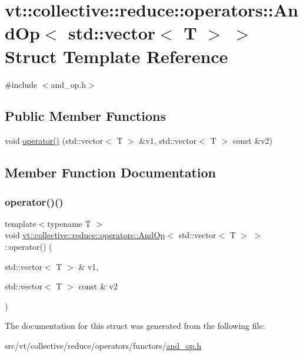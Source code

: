 \hypertarget{structvt_1_1collective_1_1reduce_1_1operators_1_1_and_op_3_01std_1_1vector_3_01_t_01_4_01_4}{}\section{vt\+:\+:collective\+:\+:reduce\+:\+:operators\+:\+:And\+Op$<$ std\+:\+:vector$<$ T $>$ $>$ Struct Template Reference}
\label{structvt_1_1collective_1_1reduce_1_1operators_1_1_and_op_3_01std_1_1vector_3_01_t_01_4_01_4}


{\ttfamily \#include $<$and\+\_\+op.\+h$>$}

\subsection*{Public Member Functions}
\begin{DoxyCompactItemize}
\item 
void \hyperlink{structvt_1_1collective_1_1reduce_1_1operators_1_1_and_op_3_01std_1_1vector_3_01_t_01_4_01_4_a70bb730a82e9ff53c5ca58e4bfa1f9e4}{operator()} (std\+::vector$<$ T $>$ \&v1, std\+::vector$<$ T $>$ const \&v2)
\end{DoxyCompactItemize}


\subsection{Member Function Documentation}
\mbox{\label{structvt_1_1collective_1_1reduce_1_1operators_1_1_and_op_3_01std_1_1vector_3_01_t_01_4_01_4_a70bb730a82e9ff53c5ca58e4bfa1f9e4}} 
\subsubsection{\texorpdfstring{operator()()}{operator()()}}
{\footnotesize\ttfamily template$<$typename T $>$ \\
void \hyperlink{structvt_1_1collective_1_1reduce_1_1operators_1_1_and_op}{vt\+::collective\+::reduce\+::operators\+::\+And\+Op}$<$ std\+::vector$<$ T $>$ $>$\+::operator() (\begin{DoxyParamCaption}\item[{std\+::vector$<$ T $>$ \&}]{v1,  }\item[{std\+::vector$<$ T $>$ const \&}]{v2 }\end{DoxyParamCaption})\hspace{0.3cm}{\ttfamily [inline]}}



The documentation for this struct was generated from the following file\+:\begin{DoxyCompactItemize}
\item 
src/vt/collective/reduce/operators/functors/\hyperlink{and__op_8h}{and\+\_\+op.\+h}\end{DoxyCompactItemize}
